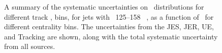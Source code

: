 \begin{figure}
   \caption{A summary of the systematic uncertainties on \RDptr\ distributions for different track \pt, bins, for jets with \pt\ 125--158 \GeV\ , as a function of \rvar\ for different centrality bins. The uncertainties from the JES, JER, UE, and Tracking  are shown, along with the total systematic uncertainty from all sources. }
      \label{fig:rdptr_sys_uncert}
\end{figure}




